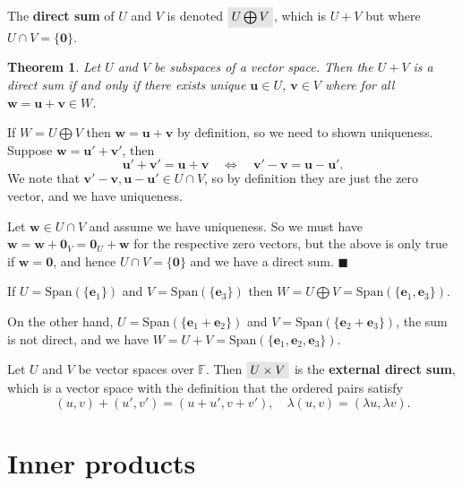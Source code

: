\documentclass[letter-paper]{tufte-book}
\newtheorem{theorem}{\color{pastel-blue}Theorem}[section]
\newenvironment{proof}[1][Proof]{\begin{trivlist}
\item[\hskip \labelsep {\bfseries #1}]}{\end{trivlist}}
\newenvironment{example}[1][Example]{\begin{trivlist}
\item[\hskip \labelsep {\bfseries #1}]}{\end{trivlist}}
\newcommand{\eb}{{\boldsymbol{e}}}
\newcommand{\ub}{{\boldsymbol{u}}}
\newcommand{\vb}{{\boldsymbol{v}}}
\newcommand{\wb}{{\boldsymbol{w}}}
\newcommand{\qed}{\hfill$\blacksquare$}
\newcommand{\highlight}[1]{\mathchoice%
  {\colorbox{black!10}{$\displaystyle#1$}}%
  {\colorbox{black!10}{$\textstyle#1$}}%
  {\colorbox{black!10}{$\scriptstyle#1$}}%
  {\colorbox{black!10}{$\scriptscriptstyle#1$}}}%
\begin{document}
The \textbf{direct sum} of $U$ and $V$ is denoted $\highlight{U \bigoplus V}$, which is $U + V$ but where $U \cap V = \{\boldsymbol{0}\}$.

\begin{theorem}
  Let $U$ and $V$ be subspaces of a vector space. Then the $U + V$ is a direct
  sum if and only if there exists unique $\ub \in U$, $\vb \in V$ where for all
  $\wb = \ub + \vb \in W$.
\end{theorem}

\begin{proof}
  If $W = U \bigoplus V$ then $\wb = \ub + \vb$ by definition, so we need to
  shown uniqueness. Suppose $\wb = \ub' + \vb'$, then
  \begin{equation*}
    \ub' + \vb' = \ub + \vb \quad \Leftrightarrow \quad \vb' - \vb = \ub - \ub'.
  \end{equation*}
  We note that $\vb' - \vb, \ub - \ub' \in U \cap V$, so by definition they are
  just the zero vector, and we have uniqueness.
  
  Let $\wb \in U \cap V$ and assume we have uniqueness. So we must have $\wb =
  \wb + \boldsymbol{0}_V = \boldsymbol{0}_U + \wb$ for the respective zero
  vectors, but the above is only true if $\wb = \boldsymbol{0}$, and hence $U
  \cap V = \{\boldsymbol{0}\}$ and we have a direct sum. \qed
\end{proof}

\begin{example}
  If $U = \mbox{Span}(\{\eb_1\})$ and $V = \mbox{Span}(\{\eb_3\})$ then $W = U
  \bigoplus V = \mbox{Span}(\{\eb_1, \eb_3\})$.
  
  On the other hand, $U = \mbox{Span}(\{\eb_1 + \eb_2\})$ and $V =
  \mbox{Span}(\{\eb_2 + \eb_3\})$, the sum is not direct, and we have $W = U + V
  = \mbox{Span}(\{\eb_1, \eb_2, \eb_3\})$.
\end{example}

Let $U$ and $V$ be vector spaces over $\mathbb{F}$. Then $\highlight{U \times
V}$ is the \textbf{external direct sum}, which is a vector space with the
definition that the ordered pairs satisfy
\begin{equation*}
  (u, v) + (u', v') = (u + u', v + v'), \quad \lambda(u, v) = (\lambda u, \lambda v).
\end{equation*}


\section{Inner products}
\end{document}
